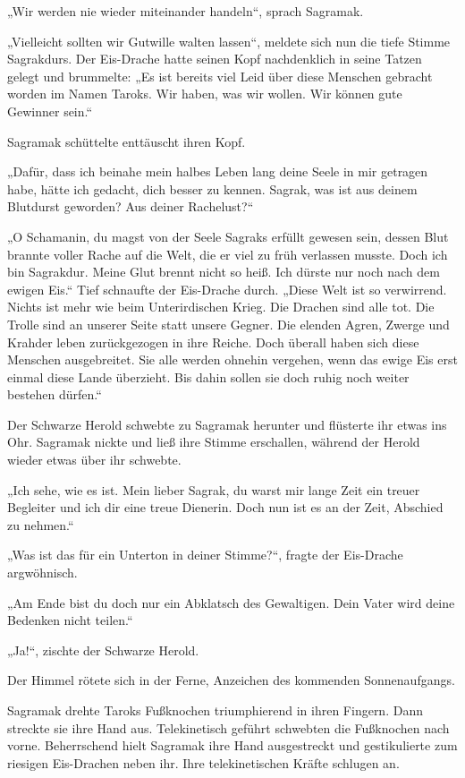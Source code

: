 „Wir werden nie wieder miteinander handeln“, sprach Sagramak.

„Vielleicht sollten wir Gutwille walten lassen“, meldete sich nun die tiefe Stimme Sagrakdurs. Der Eis-Drache hatte seinen Kopf nachdenklich in seine Tatzen gelegt und brummelte: „Es ist bereits viel Leid über diese Menschen gebracht worden im Namen Taroks. Wir haben, was wir wollen. Wir können gute Gewinner sein.“

Sagramak schüttelte enttäuscht ihren Kopf.

„Dafür, dass ich beinahe mein halbes Leben lang deine Seele in mir getragen habe, hätte ich gedacht, dich besser zu kennen. Sagrak, was ist aus deinem Blutdurst geworden? Aus deiner Rachelust?“

„O Schamanin, du magst von der Seele Sagraks erfüllt gewesen sein, dessen Blut brannte voller Rache auf die Welt, die er viel zu früh verlassen musste. Doch ich bin Sagrakdur. Meine Glut brennt nicht so heiß. Ich dürste nur noch nach dem ewigen Eis.“ Tief schnaufte der Eis-Drache durch. „Diese Welt ist so verwirrend. Nichts ist mehr wie beim Unterirdischen Krieg. Die Drachen sind alle tot. Die Trolle sind an unserer Seite statt unsere Gegner. Die elenden Agren, Zwerge und Krahder leben zurückgezogen in ihre Reiche. Doch überall haben sich diese Menschen ausgebreitet. Sie alle werden ohnehin vergehen, wenn das ewige Eis erst einmal diese Lande überzieht. Bis dahin sollen sie doch ruhig noch weiter bestehen dürfen.“

Der Schwarze Herold schwebte zu Sagramak herunter und flüsterte ihr etwas ins Ohr. Sagramak nickte und ließ ihre Stimme erschallen, während der Herold wieder etwas über ihr schwebte.

„Ich sehe, wie es ist. Mein lieber Sagrak, du warst mir lange Zeit ein treuer Begleiter und ich dir eine treue Dienerin. Doch nun ist es an der Zeit, Abschied zu nehmen.“

„Was ist das für ein Unterton in deiner Stimme?“, fragte der Eis-Drache argwöhnisch.

„Am Ende bist du doch nur ein Abklatsch des Gewaltigen. Dein Vater wird deine Bedenken nicht teilen.“

„Ja!“, zischte der Schwarze Herold.

Der Himmel rötete sich in der Ferne, Anzeichen des kommenden Sonnenaufgangs.

Sagramak drehte Taroks Fußknochen triumphierend in ihren Fingern. Dann streckte sie ihre Hand aus. Telekinetisch geführt schwebten die Fußknochen nach vorne. Beherrschend hielt Sagramak ihre Hand ausgestreckt und gestikulierte zum riesigen Eis-Drachen neben ihr. Ihre telekinetischen Kräfte schlugen an.

